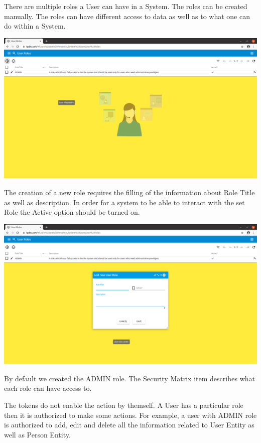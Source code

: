 There are multiple roles a User can have in a System. The roles can be created manually. The roles can have different access to data as well as to what one can do within a System.

\includegraphics[width=\textwidth]{sections/01-chapter/images/system13.png}

The creation of a new role requires the filling of the information about Role Title as well as description. In order for a system to be able to interact with the set Role the Active option should be turned on.


\includegraphics[width=\textwidth]{sections/01-chapter/images/system14.png}

By default we created the ADMIN role. 
The Security Matrix item describes what each role can have access to. 

The tokens do not enable the action by themself. A User has a particular role then it is authorized to make some actions. For example, a user with ADMIN role is authorized to add, edit and delete all the information related to User Entity as well as Person Entity.  

